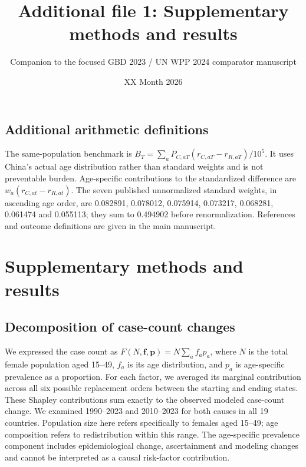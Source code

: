 \documentclass[11pt,a4paper]{article}
\title{Additional file 1: Supplementary methods and results}
\author{Companion to the focused GBD 2023 / UN WPP 2024 comparator manuscript}
\date{XX Month 2026}
\begin{document}
\maketitle
\subsection*{Additional arithmetic definitions}
The same-population benchmark is $B_T=\sum_a P_{C,aT}(r_{C,aT}-r_{R,aT})/10^5$. It uses China's actual age distribution rather than standard weights and is not preventable burden. Age-specific contributions to the standardized difference are $w_a(r_{C,at}-r_{R,at})$. The seven published unnormalized standard weights, in ascending age order, are 0.082891, 0.078012, 0.075914, 0.073217, 0.068281, 0.061474 and 0.055113; they sum to 0.494902 before renormalization. References and outcome definitions are given in the main manuscript.
\section{Supplementary methods and results}
\renewcommand{\thetable}{S\arabic{table}}\setcounter{table}{0}
\renewcommand{\thefigure}{S\arabic{figure}}\setcounter{figure}{0}
\subsection{Decomposition of case-count changes}
We expressed the case count as $F(N,\boldsymbol f,\boldsymbol p)=N\sum_a f_a p_a$, where $N$ is the total female population aged 15--49, $f_a$ is its age distribution, and $p_a$ is age-specific prevalence as a proportion. For each factor, we averaged its marginal contribution across all six possible replacement orders between the starting and ending states. These Shapley contributions sum exactly to the observed modeled case-count change. We examined 1990--2023 and 2010--2023 for both causes in all 19 countries. Population size here refers specifically to females aged 15--49; age composition refers to redistribution within this range. The age-specific prevalence component includes epidemiological change, ascertainment and modeling changes and cannot be interpreted as a causal risk-factor contribution.
\end{document}
